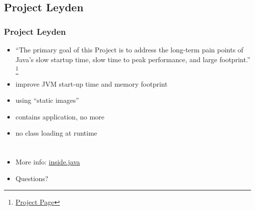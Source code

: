 \documentclass{beamer}
\begin{document}
\subsection{Project Leyden}
\begin{frame}
\frametitle{Project Leyden}
\begin{itemize}
  \item ``The primary goal of this Project is to address the long-term pain points of Java's slow startup time, slow time to peak performance, and large footprint.''
  \footnote{\href{https://openjdk.org/projects/leyden/}{Project Page}}
  \pause
  \item improve JVM start-up time and memory footprint
  \item using ``static images''
  \item contains application, no more
  \item no class loading at runtime
\end{itemize}
\end{frame}

\section{}

\begin{frame}
\frametitle{}
\begin{itemize}
  \item More info: \href{https://inside.java}{inside.java}
  \item Questions?
\end{itemize}
\end{frame}
\end{document}
